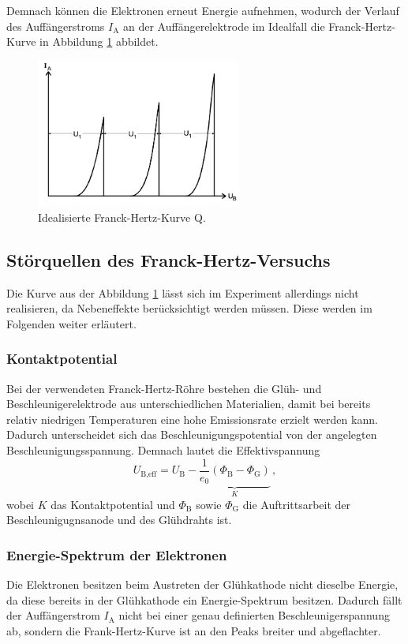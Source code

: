 Demnach können die Elektronen erneut Energie aufnehmen, wodurch der Verlauf des Auffängerstroms $I_{\text{A}}$ an der Auffängerelektrode im Idealfall die Franck-Hertz-Kurve
in Abbildung \ref{fig:idealeKure} abbildet.
\begin{figure}[h]
  \centering
  \includegraphics[width=0.6\textwidth]{content/Bilder/Ideale_Kurve.png}
  \caption{Idealisierte Franck-Hertz-Kurve Q\cite{anleitungV601}.}
  \label{fig:idealeKure}
\end{figure}
\subsection{Störquellen des Franck-Hertz-Versuchs}
\label{sec:Störquellen}
Die Kurve aus der Abbildung \ref{fig:idealeKure} lässt sich im Experiment allerdings nicht realisieren, da Nebeneffekte berücksichtigt werden müssen. Diese werden im Folgenden
weiter erläutert.
\subsubsection{Kontaktpotential}
Bei der verwendeten Franck-Hertz-Röhre bestehen die Glüh- und Beschleunigerelektrode aus unterschiedlichen Materialien, damit bei bereits relativ niedrigen Temperaturen
eine hohe Emissionsrate erzielt werden kann. Dadurch unterscheidet sich das Beschleunigungspotential von der angelegten Beschleunigungsspannung. Demnach lautet die Effektivspannung
\begin{equation}
  U_{\text{B,eff}} = U_{\text{B}} - \underbrace{\frac{1}{e_0}\left(\Phi _{\text{B}}-\Phi_{\text{G}}\right)}_{K}\,,
  \label{eqn:Effektivspannung}
\end{equation}
wobei $K$ das Kontaktpotential und $\Phi_{\text{B}}$ sowie $\Phi_{\text{G}}$ die Auftrittsarbeit der Beschleunigugnsanode und des Glühdrahts ist.
\subsubsection{Energie-Spektrum der Elektronen}
Die Elektronen besitzen beim Austreten der Glühkathode nicht dieselbe Energie, da diese bereits in der Glühkathode ein Energie-Spektrum besitzen. Dadurch fällt der
Auffängerstrom $I_{\text{A}}$ nicht bei einer genau definierten Beschleunigerspannung ab, sondern die Frank-Hertz-Kurve ist an den Peaks breiter und abgeflachter.
